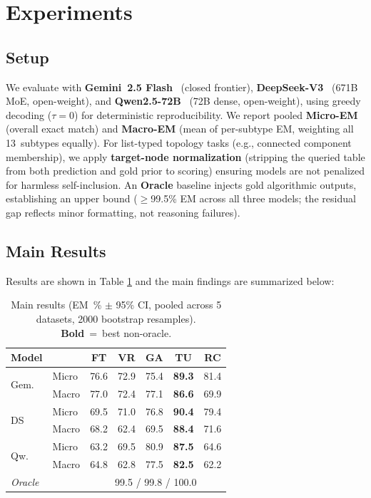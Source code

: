 \section{Experiments}

\subsection{Setup}

We evaluate with \textbf{Gemini~2.5 Flash}~\cite{gemini2024} (closed
frontier), \textbf{DeepSeek-V3}~\cite{deepseekv3} (671B MoE, open-weight),
and \textbf{Qwen2.5-72B}~\cite{qwen25} (72B dense, open-weight),
using greedy decoding ($\tau{=}0$) for deterministic reproducibility.
We report pooled \textbf{Micro-EM} (overall exact match) and
\textbf{Macro-EM} (mean of per-subtype EM, weighting all 13~subtypes
equally).  For list-typed topology tasks (e.g., connected component
membership), we apply \textbf{target-node normalization} (stripping the
queried table from both prediction and gold prior to scoring) ensuring
models are not penalized for harmless self-inclusion.
An \textbf{Oracle} baseline injects gold algorithmic outputs, establishing
an upper bound ($\geq$99.5\% EM across all three models; the residual gap
reflects minor formatting, not reasoning failures).

\subsection{Main Results}

Results are shown in Table \ref{tab:main-results} and the main findings are summarized below:

\begin{table}[t]
\centering
\caption{Main results (EM~\% $\pm$ 95\% CI, pooled across
5 datasets, 2000 bootstrap resamples).
\textbf{Bold}~=~best non-oracle.}
\label{tab:main-results}
\small
\begin{tabular}{@{}llccccc@{}}
\toprule
Model & & FT & VR & GA & TU & RC \\
\midrule
\multirow{2}{*}{Gem.}
  & Micro & 76.6 & 72.9
  & 75.4 & \textbf{89.3}
  & 81.4 \\
  & Macro & 77.0 & 72.4
  & 77.1 & \textbf{86.6}
  & 69.9 \\
\midrule
\multirow{2}{*}{DS}
  & Micro & 69.5 & 71.0
  & 76.8 & \textbf{90.4}
  & 79.4 \\
  & Macro & 68.2 & 62.4
  & 69.5 & \textbf{88.4}
  & 71.6 \\
\midrule
\multirow{2}{*}{Qw.}
  & Micro & 63.2 & 69.5
  & 80.9 & \textbf{87.5}
  & 64.6 \\
  & Macro & 64.8 & 62.8
  & 77.5 & \textbf{82.5}
  & 62.2 \\
\midrule
\multicolumn{2}{l}{\textit{Oracle}}
  & \multicolumn{5}{c}{99.5 / 99.8 / 100.0} \\
\bottomrule
\end{tabular}
\end{table}

